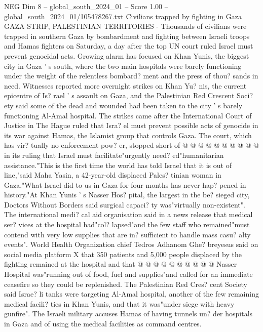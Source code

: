 \begin{textsample}{NEG Dim 8 – global\_south\_2024\_01 – Score 1.00 – global\_south\_2024\_01/105478267.txt}  \label{ex:f8_neg_176}
Civilians trapped by fighting in Gaza GAZA STRIP, PALESTINIAN TERRITORIES - Thousands of civilians were trapped in southern Gaza by bombardment and fighting between Israeli troops and Hamas fighters on Saturday, a day after the top UN court ruled Israel must prevent genocidal acts.
Growing alarm has focused on Khan Yunis, the biggest city in Gaza ' s south, where the two main hospitals were barely functioning under the weight of the relentless bombard? ment and the press of thou? sands in need.
Witnesses reported more overnight strikes on Khan Yu? nis, the current epicentre of Is? rael ' s assault on Gaza, and the Palestinian Red Crescent Soci? ety said some of the dead and wounded had been taken to the city ' s barely functioning Al-Amal hospital.
The strikes came after the International Court of Justice in The Hague ruled that Isra? el must prevent possible acts of genocide in its war against Hamas, the Islamist group that controls Gaza.
The court, which has vir? tually no enforcement pow? er, stopped short of @ @ @ @ @ @ @ @ @ @ in its ruling that Israel must facilitate"urgently need? ed"humanitarian assistance."This is the first time the world has told Israel that it is out of line,"said Maha Yasin, a 42-year-old displaced Pales? tinian woman in Gaza."What Israel did to us in Gaza for four months has never hap? pened in history."At Khan Yunis ' s Nasser Hos? pital, the largest in the be? sieged city, Doctors Without Borders said surgical capaci? ty was"virtually non-existent".
The international medi? cal aid organisation said in a news release that medical ser? vices at the hospital had"col? lapsed"and the few staff who remained"must contend with very low supplies that are in? sufficient to handle mass casu? alty events".
World Health Organization chief Tedros Adhanom Ghe? breyesus said on social media platform X that 350 patients and 5,000 people displaced by the fighting remained at the hospital and that @ @ @ @ @ @ @ @ @ @ Nasser Hospital was"running out of food, fuel and supplies"and called for an immediate ceasefire so they could be replenished.
The Palestinian Red Cres? cent Society said Israe? li tanks were targeting Al-Amal hospital, another of the few remaining medical facili? ties in Khan Yunis, and that it was"under siege with heavy gunfire".
The Israeli military accuses Hamas of having tunnels un? der hospitals in Gaza and of using the medical facilities as command centres.

\end{textsample}
